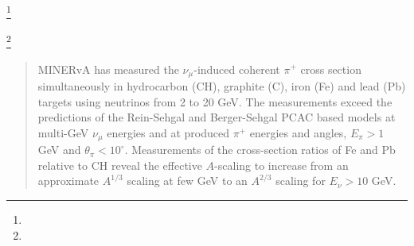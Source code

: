 \documentclass[aps,prl,twocolumn,superscriptaddress,nofootinbib]{revtex4-1}
\begin{document}
\author{E.~Maher}                         \affiliation{\MCLA}
\author{S.~Manly}                         \affiliation{\Rochester}
\author{W.A.~Mann}                        \affiliation{\Tufts}
\author{C.~Mauger}                        \affiliation{\upenn}
\author{K.S.~McFarland}                   \affiliation{\Rochester}
\author{B.~Messerly}\thanks{\bamThanks}   \affiliation{\Pittsburgh}
\author{J.~Miller}                        \affiliation{\USM}
\author{O.~Moreno}                        \affiliation{\WM}  \affiliation{\Guanajuato}
\author{J.G.~Morf\'{i}n}                  \affiliation{\FNAL}
\author{D.~Naples}                        \affiliation{\Pittsburgh}
\author{J.K.~Nelson}                      \affiliation{\WM}
\author{C.~Nguyen}                        \affiliation{\Florida}
\author{A.~Olivier}                       \affiliation{\Rochester}
\author{V.~Paolone}                       \affiliation{\Pittsburgh}
\author{G.N.~Perdue}                      \affiliation{\FNAL}  \affiliation{\Rochester}
\author{K.-J.~Plows}                      \affiliation{\oxford}
\author{R.D.~Ransome}                     \affiliation{\Rutgers}
\author{D.~Ruterbories}                   \affiliation{\Rochester}
\author{H.~Schellman}                     \affiliation{\OregonState}
\author{H.~Su}                            \affiliation{\Pittsburgh}
\author{M.~Sultana}                       \affiliation{\Rochester}
\author{V.S.~Syrotenko}                   \affiliation{\Tufts}
\author{E.~Valencia}                      \affiliation{\WM}  \affiliation{\Guanajuato}
\author{N.H.~Vaughan}                     \affiliation{\OregonState}
\author{A.V.~Waldron}                     \affiliation{\ICL}
\author{B.~Yaeggy}\thanks{\byaeggyThanks}  \affiliation{\USM}
\author{L.~Zazueta}                       \affiliation{\WM}

\noaffiliation
\date{\today}

\begin{abstract}
MINERvA has measured the $\nu_{\mu}$-induced coherent $\pi^{+}$ cross section simultaneously in
hydrocarbon (CH), graphite (C), iron (Fe) and lead (Pb) targets using neutrinos from 2 to 20 GeV.
The measurements exceed the predictions of the Rein-Sehgal and Berger-Sehgal PCAC based models at
multi-GeV $\nu_{\mu}$ energies and at produced $\pi^{+}$ energies and angles, $E_{\pi}>1$ GeV and 
$\theta_{\pi}<10^{\circ}$. Measurements of the cross-section ratios of Fe and Pb relative to CH 
reveal the effective $A$-scaling to increase from an approximate $A^{1/3}$ scaling at few GeV to 
an $A^{2/3}$ scaling for $E_{\nu}>10$ GeV.
\end{abstract}
\end{document}
